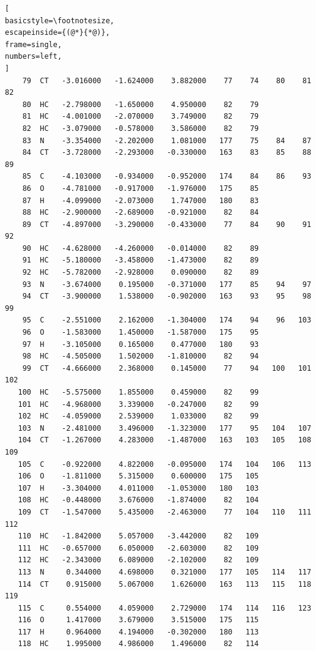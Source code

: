 \documentclass[a4paper,11pt]{scrartcl}
\begin{document}
\begin{lstlisting}[
basicstyle=\footnotesize,
escapeinside={(@*}{*@)},
frame=single,
numbers=left,
]
    79  CT   -3.016000   -1.624000    3.882000    77    74    80    81    82
    80  HC   -2.798000   -1.650000    4.950000    82    79
    81  HC   -4.001000   -2.070000    3.749000    82    79
    82  HC   -3.079000   -0.578000    3.586000    82    79
    83  N    -3.354000   -2.202000    1.081000   177    75    84    87
    84  CT   -3.728000   -2.293000   -0.330000   163    83    85    88    89
    85  C    -4.103000   -0.934000   -0.952000   174    84    86    93
    86  O    -4.781000   -0.917000   -1.976000   175    85
    87  H    -4.099000   -2.073000    1.747000   180    83
    88  HC   -2.900000   -2.689000   -0.921000    82    84
    89  CT   -4.897000   -3.290000   -0.433000    77    84    90    91    92
    90  HC   -4.628000   -4.260000   -0.014000    82    89
    91  HC   -5.180000   -3.458000   -1.473000    82    89
    92  HC   -5.782000   -2.928000    0.090000    82    89
    93  N    -3.674000    0.195000   -0.371000   177    85    94    97
    94  CT   -3.900000    1.538000   -0.902000   163    93    95    98    99
    95  C    -2.551000    2.162000   -1.304000   174    94    96   103
    96  O    -1.583000    1.450000   -1.587000   175    95
    97  H    -3.105000    0.165000    0.477000   180    93
    98  HC   -4.505000    1.502000   -1.810000    82    94
    99  CT   -4.666000    2.368000    0.145000    77    94   100   101   102
   100  HC   -5.575000    1.855000    0.459000    82    99
   101  HC   -4.968000    3.339000   -0.247000    82    99
   102  HC   -4.059000    2.539000    1.033000    82    99
   103  N    -2.481000    3.496000   -1.323000   177    95   104   107
   104  CT   -1.267000    4.283000   -1.487000   163   103   105   108   109
   105  C    -0.922000    4.822000   -0.095000   174   104   106   113
   106  O    -1.811000    5.315000    0.600000   175   105
   107  H    -3.304000    4.011000   -1.053000   180   103
   108  HC   -0.448000    3.676000   -1.874000    82   104
   109  CT   -1.547000    5.435000   -2.463000    77   104   110   111   112
   110  HC   -1.842000    5.057000   -3.442000    82   109
   111  HC   -0.657000    6.050000   -2.603000    82   109
   112  HC   -2.343000    6.089000   -2.102000    82   109
   113  N     0.344000    4.698000    0.321000   177   105   114   117
   114  CT    0.915000    5.067000    1.626000   163   113   115   118   119
   115  C     0.554000    4.059000    2.729000   174   114   116   123
   116  O     1.417000    3.679000    3.515000   175   115
   117  H     0.964000    4.194000   -0.302000   180   113
   118  HC    1.995000    4.986000    1.496000    82   114

\end{lstlisting}
\end{document}
